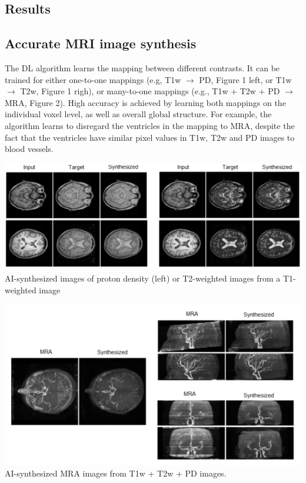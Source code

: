 \documentclass[a0, landscape]{a0poster}
\begin{document}
\begin{multicols}{3}
\color{Navy}
\section*{Results}
\subsection*{Accurate MRI image synthesis}
The DL algorithm learns the mapping between different contrasts. It can be trained for either one-to-one mappings (e.g, T1w $\rightarrow$ PD, Figure 1 left, or T1w $\rightarrow$ T2w, Figure 1 righ), or many-to-one mappings (e.g., T1w + T2w + PD $\rightarrow$ MRA, Figure 2). High accuracy is achieved by learning both mappings on the individual voxel level, as well as overall global structure. For example, the algorithm learns to disregard the ventricles in the mapping to MRA, despite the fact that the ventricles have similar pixel values in T1w, T2w and PD images to blood vessels.

\begin{minipage}[b]{1.0\linewidth}
  \includegraphics[width=\linewidth]{mri2mri.png}
  \center AI-synthesized images of proton density (left) or T2-weighted images from a T1-weighted image
\end{minipage}

\begin{minipage}[t]{0.8\linewidth}
    \includegraphics[width=0.8\linewidth]{MRA.png}
    \center AI-synthesized MRA images from T1w + T2w + PD images.
\end{minipage}


\end{multicols}
\end{document}
